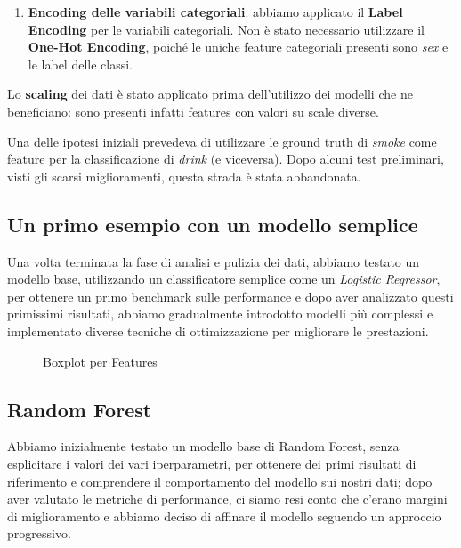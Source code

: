 \documentclass{article}
\begin{document}
\begin{multicols}{2}
\begin{enumerate}[leftmargin=*]
    \item \textbf{Encoding delle variabili categoriali}:
    abbiamo applicato il \textbf{Label Encoding} per le variabili categoriali.
    Non è stato necessario utilizzare il \textbf{One-Hot Encoding}, poiché le uniche feature categoriali presenti sono \textit{sex} e le label delle classi.
\end{enumerate}

Lo \textbf{scaling} dei dati è stato applicato prima dell'utilizzo dei modelli che ne beneficiano: sono presenti infatti features con valori su scale diverse.

Una delle ipotesi iniziali prevedeva di utilizzare le ground truth di \textit{smoke} come feature per la classificazione di \textit{drink} (e viceversa).
Dopo alcuni test preliminari, visti gli scarsi miglioramenti, questa strada è stata abbandonata.

\subsection{Un primo esempio con un modello semplice}

Una volta terminata la fase di analisi e pulizia dei dati, abbiamo testato un modello base, utilizzando un classificatore semplice come un \textit{Logistic Regressor}, per ottenere un primo benchmark sulle performance e dopo aver analizzato questi primissimi risultati, abbiamo gradualmente introdotto modelli più complessi e implementato diverse tecniche di ottimizzazione per migliorare le prestazioni.

\begin{figure}[!htb]
  \centering
  
  \caption{Boxplot per Features}
  \label{fig:feature_boxplots}
\end{figure}


\subsection{Random Forest}

Abbiamo inizialmente testato un modello base di Random Forest, senza esplicitare i valori dei vari iperparametri, per ottenere dei primi risultati di riferimento e comprendere il comportamento del modello sui nostri dati; dopo aver valutato le metriche di performance, ci siamo resi conto che c'erano margini di miglioramento e abbiamo deciso di affinare il modello seguendo un approccio progressivo.


\end{multicols}
\end{document}
